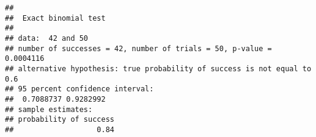 \begin{knitrout}
\color{fgcolor}\begin{kframe}
\begin{alltt}
\hlstd{(}\hlstd{,} \hlstd{,}  \hlstd{=} \hlstd{)}
\end{alltt}
\begin{verbatim}
## 
## 	Exact binomial test
## 
## data:  42 and 50
## number of successes = 42, number of trials = 50, p-value = 0.0004116
## alternative hypothesis: true probability of success is not equal to 0.6
## 95 percent confidence interval:
##  0.7088737 0.9282992
## sample estimates:
## probability of success 
##                   0.84
\end{verbatim}
\end{kframe}
\end{knitrout}





